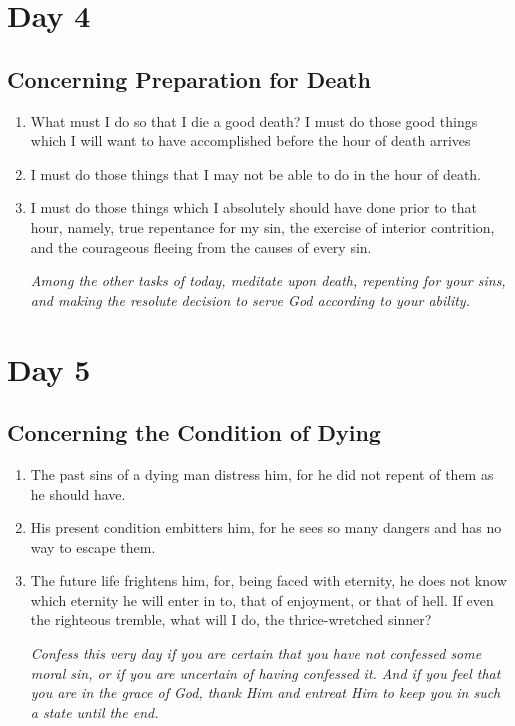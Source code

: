 \documentclass[11pt]{article}
\begin{document}
\section*{Day 4}
\label{sec:orgf27b6cd}
\subsection*{Concerning Preparation for Death}
\label{sec:org9ca5c8e}
\begin{enumerate}
\item What must I do so that I die a good death? I must do those good things which I will want to have accomplished before the hour of death arrives
\item I must do those things that I may not be able to do in the hour of death.
\item I must do those things which I absolutely should have done prior to that hour, namely, true repentance for my sin, the exercise of interior contrition, and the courageous fleeing from the causes of every sin.

\emph{Among the other tasks of today, meditate upon death, repenting for your sins, and making the resolute decision to serve God according to your ability.}
\end{enumerate}
\section*{Day 5}
\label{sec:orge06013e}
\subsection*{Concerning the Condition of Dying}
\label{sec:org736865d}
\begin{enumerate}
\item The past sins of a dying man distress him, for he did not repent of them as he should have.
\item His present condition embitters him, for he sees so many dangers and has no way to escape them.
\item The future life frightens him, for, being faced with eternity, he does not know which eternity
he will enter in to, that of enjoyment, or that of hell. If even the righteous tremble, what
will I do, the thrice-wretched sinner?

\emph{Confess this very day if you are certain that you have not confessed some moral sin, or if you are uncertain of having confessed it. And if you feel that you are in the grace of God, thank Him and entreat Him
to keep you in such a state until the end.}
\end{enumerate}
\end{document}
